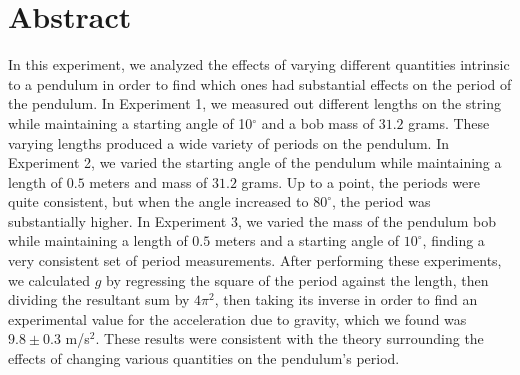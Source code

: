\documentclass[10pt]{extarticle}
\title{}
\author{Avinash Iyer}
\date{}
\begin{document}
{
\section*{Abstract}
In this experiment, we analyzed the effects of varying different quantities intrinsic to a pendulum in order to find which ones had substantial effects on the period of the pendulum. In Experiment 1, we measured out different lengths on the string while maintaining a starting angle of 10$^{\circ}$ and a bob mass of $31.2$ grams. These varying lengths produced a wide variety of periods on the pendulum. In Experiment 2, we varied the starting angle of the pendulum while maintaining a length of $0.5$ meters and mass of $31.2$ grams. Up to a point, the periods were quite consistent, but when the angle increased to $80^{\circ}$, the period was substantially higher. In Experiment 3, we varied the mass of the pendulum bob while maintaining a length of $0.5$ meters and a starting angle of $10^{\circ}$, finding a very consistent set of period measurements. After performing these experiments, we calculated $g$ by regressing the square of the period against the length, then dividing the resultant sum by $4\pi^2$, then taking its inverse in order to find an experimental value for the acceleration due to gravity, which we found was $9.8\pm 0.3$ m/s$^2$. These results were consistent with the theory surrounding the effects of changing various quantities on the pendulum's period. 
}
\end{document}
